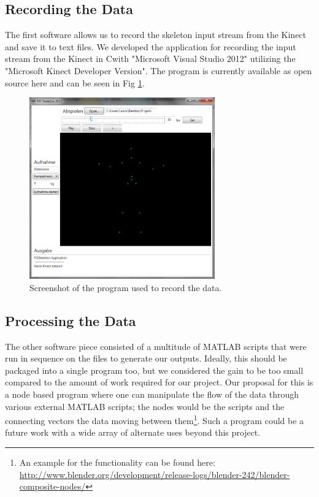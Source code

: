 \documentclass[a4paper]{article}
\newcommand{\CS}{C\nolinebreak\hspace{-.05em}\raisebox{.6ex}{\scriptsize\bf \#\ }}
\begin{document}
\subsection{Recording the Data}

The first software allows us to record the skeleton input stream from the Kinect and save it to text files.
We developed the application for recording the input stream from the Kinect in \CS with "Microsoft Visual Studio 2012" utilizing the "Microsoft Kinect Developer Version".
The program is currently available as open source here \cite{csprogram} and can be seen in Fig \ref{fig:programm}.

\begin{figure}
	\centering
	\includegraphics[width=8cm]{programm.jpg}
	\caption{Screenshot of the program used to record the data.}
	\label{fig:programm}
\end{figure}

\subsection{Processing the Data}

The other software piece consisted of a multitude of MATLAB\cite{matlabprograms} scripts that were run in sequence on the files to generate our outputs. Ideally, this should be packaged into a single program too, but we considered the gain to be too small compared to the amount of work required for our project.
Our proposal for this is a node based program where one can manipulate the flow of the data through various external MATLAB scripts; the nodes would be the scripts and the connecting vectors the data moving between them\footnote{An example for the functionality can be found here: \url{http://www.blender.org/development/release-logs/blender-242/blender-composite-nodes/}}.
Such a program could be a future work with a wide array of alternate uses beyond this project.
\end{document}
